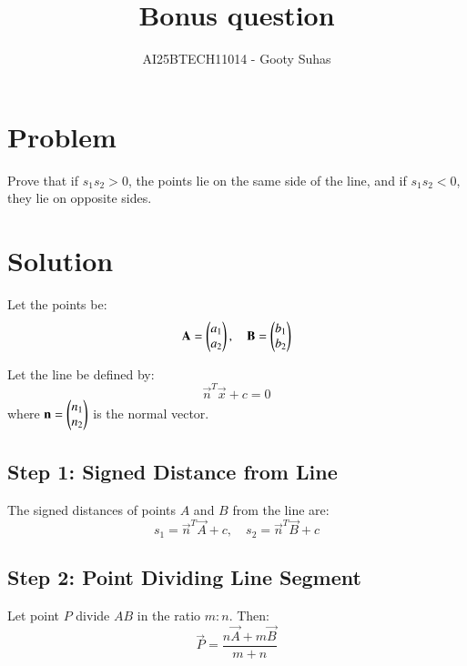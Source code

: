 \documentclass[journal]{IEEEtran}
\begin{document}

\vspace{3cm}

\title{Bonus question}
\author{AI25BTECH11014 - Gooty Suhas}
{\let\newpage\relax\maketitle}

\renewcommand{\thefigure}{\theenumi}
\renewcommand{\thetable}{\theenumi}
\setlength{\intextsep}{10pt}
\renewcommand{\thetable}{\theenumi}

\section*{\large\textbf{Problem}}
\vspace{0.5cm}

Prove that if \( s_1s_2 > 0 \), the points lie on the same side of the line, and if \( s_1s_2 < 0 \), they lie on opposite sides.

\section*{\large\textbf{Solution}}
\vspace{0.5cm}

Let the points be:
\[
\mathbf{A} = \begin{pmatrix}a_1 \\ a_2\end{pmatrix}, \quad
\mathbf{B} = \begin{pmatrix}b_1 \\ b_2\end{pmatrix}
\]

Let the line be defined by:
\[
\vec{n}^T \vec{x} + c = 0
\]
where \( \mathbf{n} = \begin{pmatrix}n_1 \\ n_2\end{pmatrix} \) is the normal vector.

\subsection*{Step 1: Signed Distance from Line}

The signed distances of points \( A \) and \( B \) from the line are:
\[
s_1 = \vec{n}^T \vec{A} + c, \quad
s_2 = \vec{n}^T \vec{B} + c
\]

\subsection*{Step 2: Point Dividing Line Segment}

Let point \( P \) divide \( AB \) in the ratio \( m:n \). Then:
\[
\vec{P} = \frac{n\vec{A} + m\vec{B}}{m+n}
\]
\end{document}
